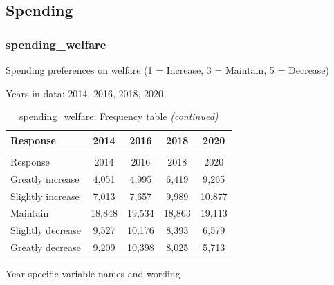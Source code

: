 \documentclass[
  12pt]{article}
\begin{document}
\hypertarget{spending}{%
\subsection{Spending}\label{spending}}

\hypertarget{spending_welfare}{%
\subsubsection{spending\_welfare}\label{spending_welfare}}

Spending preferences on welfare (1 = Increase, 3 = Maintain, 5 =
Decrease)

Years in data: 2014, 2016, 2018,
2020\begingroup\fontsize{10}{12}\selectfont

\begin{longtable}[t]{lcccc}
\caption{\label{tab:unnamed-chunk-5}spending\_welfare: Frequency table}\\
\toprule
Response & 2014 & 2016 & 2018 & 2020\\
\midrule
\endfirsthead
\caption[]{spending\_welfare: Frequency table \textit{(continued)}}\\
\toprule
Response & 2014 & 2016 & 2018 & 2020\\
\midrule
\endhead

\endfoot
\bottomrule
\endlastfoot
Greatly increase & 4,051 & 4,995 & 6,419 & 9,265\\
Slightly increase & 7,013 & 7,657 & 9,989 & 10,877\\
Maintain & 18,848 & 19,534 & 18,863 & 19,113\\
Slightly decrease & 9,527 & 10,176 & 8,393 & 6,579\\
Greatly decrease & 9,209 & 10,398 & 8,025 & 5,713\\*
\end{longtable}
\endgroup{}

Year-specific variable names and
wording\begingroup\fontsize{11}{13}\selectfont
\end{document}
